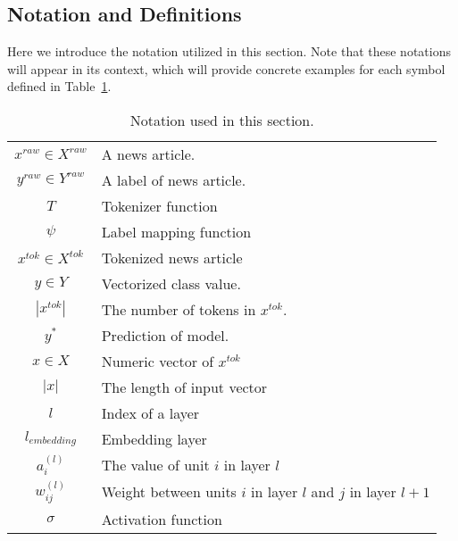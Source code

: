 \subsection{Notation and Definitions}
\label{subsec:newsContentModels_Definitions}
Here we introduce the notation utilized in this section. Note that these notations will appear in its context, which will provide concrete examples for each symbol defined in Table~\ref{tab:newsContentModels_Notation}.\\
\begin{table}
    \begin{tabular}{cp{}}
        $x^{raw} \in X^{raw}$ & A news article.                                              \\
        $y^{raw} \in Y^{raw}$ & A label of news article.                                     \\
        $T$                   & Tokenizer function                                           \\
        $\psi$                & Label mapping function                                       \\
        $x^{tok} \in X^{tok}$ & Tokenized news article                                       \\
        $y \in Y$             & Vectorized class value.                                      \\
        $|x^{tok}|$           & The number of tokens in $x^{tok}$.                           \\
        $y^*$                 & Prediction of model.                                         \\
        $x \in X$             & Numeric vector of $x^{tok}$                                  \\
        $|x|$                 & The length of input vector                                   \\
        $l$                   & Index of a layer                                             \\
        $l_{embedding}$       & Embedding layer                                              \\
        $a_{i}^{(l)}$         & The value of unit $i$ in layer $l$                           \\
        $w_{ij}^{(l)}$        & Weight between units $i$ in layer $l$ and $j$ in layer $l+1$ \\
        $\sigma$              & Activation function                                          \\
    \end{tabular}
    \caption[Notation]{Notation used in this section.}
    \label{tab:newsContentModels_Notation}
\end{table}
